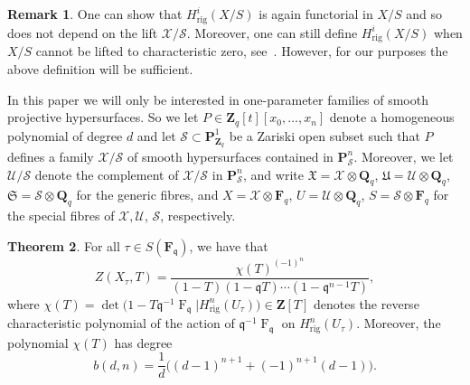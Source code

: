 \documentclass[a4paper,11pt]{article}
\numberwithin{equation}{section}
\newcommand{\ZZ}{\mathbf{Z}} %
\newcommand{\QQ}{\mathbf{Q}} %
\newcommand{\FF}{\mathbf{F}} %
\DeclareMathOperator{\Frob}{F}           %
\providecommand{\Hrig}{H_{\text{rig}}}  %
\theoremstyle{definition}
\newtheorem{thm}{Theorem}[section]
\newtheorem{rem}[thm]{Remark}
\begin{document}
\begin{rem}
One can show that $\Hrig^i(X/S)$ is again functorial in $X/S$ and so does 
not depend on the lift $\mathcal{X}/\mathcal{S}$. Moreover, one can still 
define $\Hrig^i(X/S)$ when $X/S$ cannot be lifted to characteristic zero, 
see~\citep{Berthelot1986}.  However, for our purposes the above definition 
will be sufficient.
\end{rem}

In this paper we will only be interested in one-parameter families of smooth 
projective hypersurfaces. So we let $P \in \ZZ_q[t][x_0,\dotsc,x_n]$ denote 
a homogeneous polynomial of degree $d$ and let 
$\mathcal{S} \subset \mathbf{P}^1_{\ZZ_q}$ be a Zariski open subset such that 
$P$ defines a family $\mathcal{X}/\mathcal{S}$ of smooth hypersurfaces contained 
in $\mathbf{P}^n_{\mathcal{S}}$. Moreover, we let $\mathcal{U}/\mathcal{S}$ 
denote the complement of $\mathcal{X}/\mathcal{S}$ in $\mathbf{P}^n_{\mathcal{S}}$,
and write $\mathfrak{X}=\mathcal{X} \otimes \QQ_q$, 
$\mathfrak{U}=\mathcal{U} \otimes \QQ_q$, $\mathfrak{S}=\mathcal{S} \otimes \QQ_q$
for the generic fibres, and $X=\mathcal{X} \otimes \FF_q$, 
$U=\mathcal{U} \otimes \QQ_q$, $S=\mathcal{S} \otimes \FF_q$ for the special 
fibres of $\mathcal{X},\mathcal{U}$, $\mathcal{S}$, respectively.

\begin{thm} \label{thm:hypersurface} 
For all $\tau \in S(\FF_{\mathfrak{q}})$, we have that
\begin{equation} \label{eq:formulazeta}
Z(X_{\tau},T) = \frac{\chi(T)^{(-1)^n}}{(1 - T) (1 - \mathfrak{q}T) \dotsm (1 - \mathfrak{q}^{n-1}T)},
\end{equation}
where 
$\chi(T) = \det \bigl( 1 - T \mathfrak{q}^{-1} \Frob_{\mathfrak{q}} | \Hrig^n(U_{\tau}) \bigr) \in \ZZ[T]$
denotes the reverse characteristic polynomial of the action of 
$\mathfrak{q}^{-1} \Frob_{\mathfrak{q}}$ on $\Hrig^n(U_{\tau})$. 
Moreover, the polynomial $\chi(T)$ has degree 
\begin{equation} \label{eq:formulab}
b(d,n) = \frac{1}{d} \bigl((d-1)^{n+1} + (-1)^{n+1}(d-1) \bigr).
\end{equation}
\end{thm}
\end{document}
